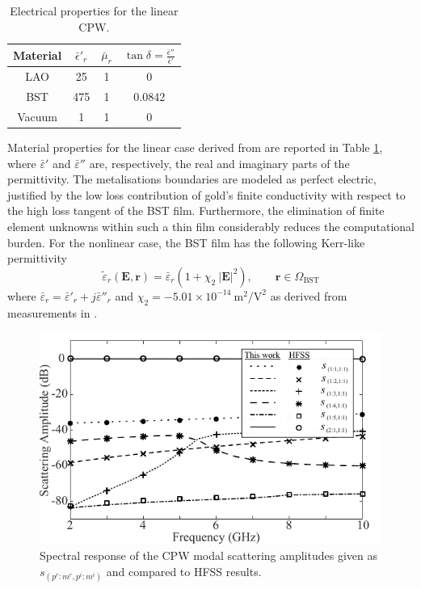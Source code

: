 \documentclass[AMA,STIX2COL]{WileyNJD-v2}
\begin{document}
\begin{table}[t!]
\begin{center}
\begin{tabular}{|c||c|c|c|} \hline
Material & ${\bar{\epsilon}'}_r$ & $\bar{\mu}_r$ & $\tan \delta = \frac{\bar{\epsilon}''}{\bar{\epsilon}'}$ \\ \hline \hline
LAO & 25 & 1  & 0 \\ \hline
BST & 475 & 1 & 0.0842 \\ \hline
Vacuum & 1 & 1 & 0 \\ \hline
\end{tabular}
\end{center}
\caption{Electrical properties for the linear CPW.}
\label{tab:CPWmat}
\end{table}
%
Material properties for the linear case derived from \cite{mateu2006measurements} are reported in Table \ref{tab:CPWmat}, where $\bar{\varepsilon}'$ and $\bar{\varepsilon}''$ are, respectively, the real and imaginary parts of the permittivity. The metalisations boundaries are modeled as perfect electric, justified by the low loss contribution of gold's finite conductivity with respect to the high loss tangent of the BST film. Furthermore, the elimination of finite element unknowns within such a thin film considerably reduces the computational burden. For the nonlinear case, the BST film has the following Kerr-like permittivity
\begin{equation}
\label{eq:Kerr}
\tilde{{\varepsilon}}_r(\mathbf{E}, \mathbf{r}) = {\bar{\varepsilon}}_r \left( 1 + \chi_2 \ |\mathbf{E}|^2 \right), \qquad \mathbf{r} \in \Omega_\text{BST}
\end{equation}
%
\noindent where ${\bar{\varepsilon}}_r = {\bar{\varepsilon}'}_r  + j {\bar{\varepsilon}''}_r $ and $\chi_2 = -5.01 \times 10^{-14}~{\text{m}^2}/{\text{V}^2}$ as derived from measurements in \cite{mateu2006measurements}.
%
\begin{figure}[t!]
\centering
\includegraphics[width=\columnwidth]{spectrum}
\caption{Spectral response of the CPW modal scattering amplitudes given as $s_{(p^r:m^r,p^i:m^i)}$ and compared to HFSS results. }
\label{fig:Scattering}
\end{figure}
\end{document}
